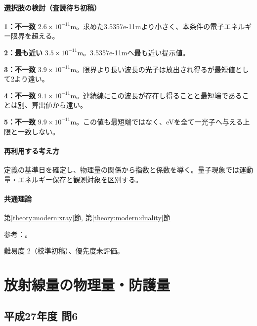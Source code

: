 \paragraph{選択肢の検討（査読待ち初稿）}\mbox{}\par

\noindent\textbf{1：不一致} \(2.6\times10^{-11}\mathrm{m}\)。求めた3.5357e-11mより小さく、本条件の電子エネルギー限界を超える。\par

\noindent\textbf{2：最も近い} \(3.5\times10^{-11}\mathrm{m}\)。3.5357e-11mへ最も近い提示値。\par

\noindent\textbf{3：不一致} \(3.9\times10^{-11}\mathrm{m}\)。限界より長い波長の光子は放出され得るが最短値として2より遠い。\par

\noindent\textbf{4：不一致} \(9.1\times10^{-11}\mathrm{m}\)。連続線にこの波長が存在し得ることと最短端であることは別、算出値から遠い。\par

\noindent\textbf{5：不一致} \(9.9\times10^{-11}\mathrm{m}\)。この値も最短端ではなく、eVを全て一光子へ与える上限と一致しない。\par

\paragraph{再利用する考え方} 定義の基準日を確定し、物理量の関係から指数と係数を導く。量子現象では運動量・エネルギー保存と観測対象を区別する。

\paragraph{共通理論} \hyperref[theory:modern:xray]{第\ref*{theory:modern:xray}節}, \hyperref[theory:modern:duality]{第\ref*{theory:modern:duality}節}

\par 参考：\cite{os_photoelectric}。

\par 難易度 2（校準初稿）、優先度未評価。

\section{放射線量の物理量・防護量}

\subsection{平成27年度 問6}
\label{q:h27-reg-applied-06}

